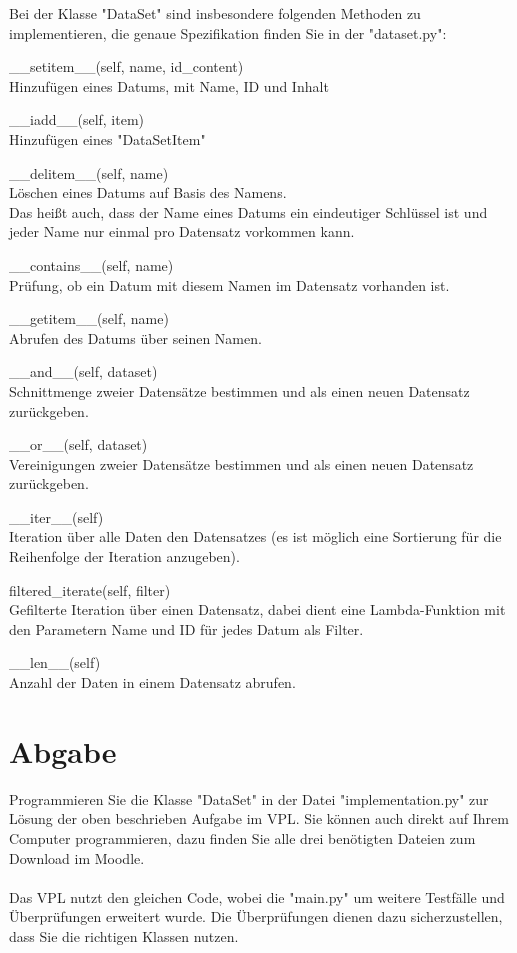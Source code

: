 \documentclass[oneside, 11pt, a4paper, parskip=full]{scrartcl}
\begin{document}
Bei der Klasse "DataSet" sind insbesondere folgenden Methoden zu implementieren, die genaue Spezifikation finden Sie in der "dataset.py":
\begin{compactitem}
\item \_\_setitem\_\_(self, name, id\_content)\\
      Hinzufügen eines Datums, mit Name, ID und Inhalt
\item \_\_iadd\_\_(self, item)\\
      Hinzufügen eines "DataSetItem"
\item \_\_delitem\_\_(self, name)\\
      Löschen eines Datums auf Basis des Namens.\\
      Das heißt auch, dass der Name eines Datums ein eindeutiger Schlüssel ist und jeder Name nur einmal pro Datensatz vorkommen kann.
\item \_\_contains\_\_(self, name)\\
      Prüfung, ob ein Datum mit diesem Namen im Datensatz vorhanden ist.
\item \_\_getitem\_\_(self, name)\\
      Abrufen des Datums über seinen Namen.
\item \_\_and\_\_(self, dataset)\\
      Schnittmenge zweier Datensätze bestimmen und als einen neuen Datensatz zurückgeben.
\item \_\_or\_\_(self, dataset)\\
      Vereinigungen zweier Datensätze bestimmen und als einen neuen Datensatz zurückgeben.
\item \_\_iter\_\_(self)\\
      Iteration über alle Daten den Datensatzes (es ist möglich eine Sortierung für die Reihenfolge der Iteration anzugeben).
\item filtered\_iterate(self, filter)\\
      Gefilterte Iteration über einen Datensatz, dabei dient eine Lambda-Funktion mit den Parametern Name und ID für jedes Datum als Filter.
\item \_\_len\_\_(self)\\
      Anzahl der Daten in einem Datensatz abrufen.
\end{compactitem}

\section{Abgabe}

Programmieren Sie die Klasse "DataSet" in der Datei "implementation.py" zur Lösung der oben beschrieben Aufgabe im VPL.
Sie können auch direkt auf Ihrem Computer programmieren, dazu finden Sie alle drei benötigten Dateien zum Download im Moodle.\\
\\
Das VPL nutzt den gleichen Code, wobei die "main.py" um weitere Testfälle und Überprüfungen erweitert wurde.
Die Überprüfungen dienen dazu sicherzustellen, dass Sie die richtigen Klassen nutzen.
\end{document}
